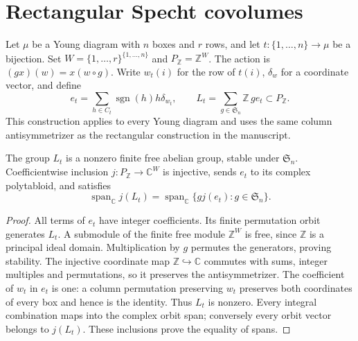 \chapter{Rectangular Specht covolumes}

\begin{definition}
\label{def:integral-specht-orbit}
\leanok
Let $\mu$ be a Young diagram with $n$ boxes and $r$ rows, and let
$t:\{1,\ldots,n\}\longrightarrow\mu$ be a bijection. Set
$W=\{1,\ldots,r\}^{\{1,\ldots,n\}}$ and $P_\mathbb Z=\mathbb Z^W$.
The action is $(g x)(w)=x(w\circ g)$. Write $w_t(i)$ for the row of
$t(i)$, $\delta_w$ for a coordinate vector, and define
\[
 e_t=\sum_{h\in C_t}\operatorname{sgn}(h)h\delta_{w_t},\qquad
 L_t=\sum_{g\in\mathfrak S_n}\mathbb Z\,g e_t\subset P_\mathbb Z.
\]
This construction applies to every Young diagram and uses the same
column antisymmetrizer as the rectangular construction in the manuscript.
\end{definition}

\begin{lemma}
\label{lem:integral-specht-span}
\leanok
The group $L_t$ is a nonzero finite free abelian group, stable under
$\mathfrak S_n$. Coefficientwise inclusion $j:P_\mathbb Z\to\mathbb C^W$
is injective, sends $e_t$ to its complex polytabloid, and satisfies
\[
 \operatorname{span}_\mathbb C j(L_t)
 =\operatorname{span}_\mathbb C\{g j(e_t):g\in\mathfrak S_n\}.
\]
\end{lemma}
\begin{proof}
All terms of $e_t$ have integer coefficients. Its finite permutation
orbit generates $L_t$. A submodule of the finite free module $\mathbb Z^W$
is free, since $\mathbb Z$ is a principal ideal domain. Multiplication
by $g$ permutes the generators, proving stability. The injective
coordinate map $\mathbb Z\hookrightarrow\mathbb C$ commutes with sums,
integer multiples and permutations, so it preserves the antisymmetrizer.
The coefficient of $w_t$ in $e_t$ is one: a column permutation preserving
$w_t$ preserves both coordinates of every box and hence is the identity.
Thus $L_t$ is nonzero. Every integral combination maps into the complex
orbit span; conversely every orbit vector belongs to $j(L_t)$. These
inclusions prove the equality of spans.
\end{proof}

